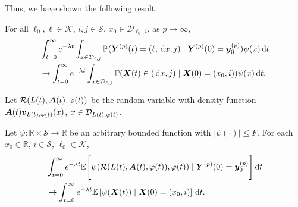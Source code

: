 Thus, we have shown the following result.
\begin{lem}\label{lem: KajPOw}
	For all \(\ell_0,\ell\in\mathcal K\), \(i,j\in\mathcal S\), \(x_0\in\mathcal D_{\ell_0,i}\), as \(p\to\infty\), 
	\begin{align}
		&\int_{t=0}^\infty e^{-\lambda t}\int_{x\in\mathcal D_{\ell,j}}\mathbb P( {\boldsymbol Y}^{(p)}(t) = (\ell,\, \mathrm{d} x,j) \mid \boldsymbol Y^{(p)}(0)=\boldsymbol y_0^{(p)})  \psi(x)\, \mathrm{d} t \nonumber
		\\&\to \int_{t=0}^\infty e^{-\lambda t}  \int_{x\in\mathcal{D}_{\ell,j}} \mathbb P(\boldsymbol X(t)\in(\, \mathrm{d} x, j)  
		\mid \boldsymbol X(0)=(x_0, i))\psi(x)\, \mathrm{d} t. \nonumber
	\end{align}
\end{lem}
 
Let \(\mathcal R(L(t),\boldsymbol A(t),\varphi(t))\) be the random variable with density function \(\boldsymbol A(t)\boldsymbol v_{L(t),\varphi(t)}(x)\), \(x\in\mathcal{D}_{L(t),\varphi(t)}\). 
\begin{cor}\label{cor: lk}
	Let \(\psi: \mathbb R\times \mathcal S \to \mathbb R\) be an arbitrary bounded function with \(|\psi(\cdot)|\leq F\). %
	For each \(x_0\in\mathbb R\), \(i\in\mathcal S\), \(\ell_0\in\mathcal K\), 
	\begin{align}
		&\int_{t=0}^\infty e^{-\lambda t}\mathbb E\Bigg[\psi(\mathcal R(L(t),\boldsymbol A(t),\varphi(t)),\varphi(t) )  \mid \nonumber
		\boldsymbol Y^{(p)}(0)=\boldsymbol y_0^{(p)} \Bigg] \, \mathrm{d} t \nonumber
		\\&\to \int_{t=0}^\infty e^{-\lambda t}  \mathbb E\left[\psi({\boldsymbol X}(t))\mid \boldsymbol X(0)=(x_0, i) \right] \, \mathrm{d} t.\nonumber
	\end{align}
\end{cor}

